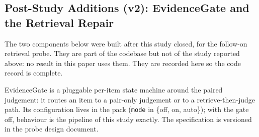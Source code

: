 \documentclass{article} %
\begin{document}
\subsection{Post-Study Additions (v2): EvidenceGate and the Retrieval Repair}
\label{app:code-v2}
The two components below were built after this study closed, for the follow-on retrieval probe. They are part of the codebase but not of the study reported above: no result in this paper uses them. They are recorded here so the code record is complete.

EvidenceGate is a pluggable per-item state machine around the paired judgement: it routes an item to a pair-only judgement or to a retrieve-then-judge path. Its configuration lives in the pack (\texttt{mode} in \{off, on, auto\}); with the gate off, behaviour is the pipeline of this study exactly. The specification is versioned in the probe design document.
\end{document}
